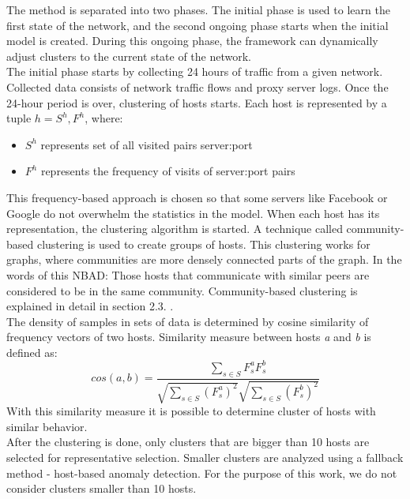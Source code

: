 \documentclass[thesis=B,english]{FITthesis}[2012/10/20]
\begin{document}
The method is separated into two phases.                   
The initial phase is used to learn the first state of the network, and the second ongoing phase starts when the initial model is created.
During this ongoing phase, the framework can dynamically adjust clusters to the current state of the network. \\
                                                                                  
The initial phase starts by collecting 24 hours of traffic from a given network.        
Collected data consists of network traffic flows and proxy server logs.           
Once the 24-hour period is over, clustering of hosts starts.                      
Each host is represented by a tuple $h = {S^h, F^h}$, where:                      
\begin{itemize}                                                                   
    \item $S^h$ represents set of all visited pairs server:port                   
    \item $F^h$ represents the frequency of visits of server:port pairs           
\end{itemize}                                                                     
This frequency-based approach is chosen so that some servers like Facebook or Google do not overwhelm the statistics in the model.
When each host has its representation, the clustering algorithm is started.
A technique called community-based clustering is used to create groups of hosts.
This clustering works for graphs, where communities are more densely connected parts of the graph.
In the words of this NBAD: Those hosts that communicate with similar peers are considered to be in the same community.
Community-based clustering is explained in detail in section 2.3. . \\

The density of samples in sets of data is determined by cosine similarity of frequency vectors of two hosts.
Similarity measure between hosts \textit{a} and \textit{b} is defined as:
$$cos(a, b) = \frac{\sum_{s \in S} F_s^a F_s^b} {\sqrt{\sum_{s \in S} (F_s^a)^2} \sqrt{\sum_{s \in S} (F_s^b)^2}}$$
With this similarity measure it is possible to determine cluster of hosts with similar behavior. \\

After the clustering is done, only clusters that are bigger than 10 hosts are selected for representative selection.
Smaller clusters are analyzed using a fallback method - host-based anomaly detection.
For the purpose of this work, we do not consider clusters smaller than 10 hosts. \\
\end{document}

